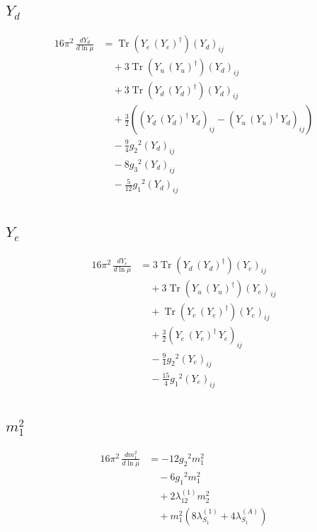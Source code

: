 \documentclass[10pt,a4paper]{article}
\begin{document}
\subsection*{$Y_d$}
\begin{align*}
16\pi^2\,\frac{d Y_d}{d\ln\mu} &=\operatorname{Tr}\!\left({Y_e}\,\left({Y_e}\right)^{\dagger}\right) \left({Y_d}\right)_{ij} \\
&\quad +3 \operatorname{Tr}\!\left({Y_u}\,\left({Y_u}\right)^{\dagger}\right) \left({Y_d}\right)_{ij} \\
&\quad +3 \operatorname{Tr}\!\left({Y_d}\,\left({Y_d}\right)^{\dagger}\right) \left({Y_d}\right)_{ij} \\
&\quad +\frac{3}{2} (\left({Y_d}\,\left({Y_d}\right)^{\dagger}\,{Y_d}\right)_{ij}-\left({Y_u}\,\left({Y_u}\right)^{\dagger}\,{Y_d}\right)_{ij}) \\
&\quad -\frac{9}{4} {g_2}^2 \left({Y_d}\right)_{ij} \\
&\quad -8 {g_3}^2 \left({Y_d}\right)_{ij} \\
&\quad -\frac{5}{12} {g_1}^2 \left({Y_d}\right)_{ij} \\
\end{align*}
\subsection*{$Y_e$}
\begin{align*}
16\pi^2\,\frac{d Y_e}{d\ln\mu} &=3 \operatorname{Tr}\!\left({Y_d}\,\left({Y_d}\right)^{\dagger}\right) \left({Y_e}\right)_{ij} \\
&\quad +3 \operatorname{Tr}\!\left({Y_u}\,\left({Y_u}\right)^{\dagger}\right) \left({Y_e}\right)_{ij} \\
&\quad +\operatorname{Tr}\!\left({Y_e}\,\left({Y_e}\right)^{\dagger}\right) \left({Y_e}\right)_{ij} \\
&\quad +\frac{3}{2} \left({Y_e}\,\left({Y_e}\right)^{\dagger}\,{Y_e}\right)_{ij} \\
&\quad -\frac{9}{4} {g_2}^2 \left({Y_e}\right)_{ij} \\
&\quad -\frac{15}{4} {g_1}^2 \left({Y_e}\right)_{ij} \\
\end{align*}
\subsection*{$m_1^2$}
\begin{align*}
16\pi^2\,\frac{d m_1^2}{d\ln\mu} &=-12 {g_2}^2 {m_1^2} \\
&\quad -6 {g_1}^2 {m_1^2} \\
&\quad +2 {\lambda_{12}^{(1)}} {m_2^2} \\
&\quad +{m_1^2} (8 {\lambda_{S_1}^{(1)}}+4 {\lambda_{S_1}^{(A)}}) \\
\end{align*}
\end{document}
